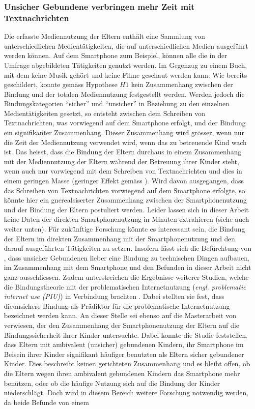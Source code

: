 \subsubsection{Unsicher Gebundene verbringen mehr Zeit mit Textnachrichten}
Die erfasste Mediennutzung der Eltern enthält eine Sammlung von unterschiedlichen Medientätigkeiten, die auf unterschiedlichen Medien ausgeführt werden können. Auf dem Smartphone zum Beispiel, können alle die in der Umfrage abgebildeten Tätigkeiten genutzt werden. Im Gegenzug zu einem Buch, mit dem keine Musik gehört und keine Filme geschaut werden kann. Wie bereits geschildert, konnte gemäss Hypothese $H1$ kein Zusammenhang zwischen der Bindung und der totalen Mediennutzung festgestellt werden. Werden jedoch die Bindungskategorien \enquote{sicher} und \enquote{unsicher} in Beziehung zu den einzelnen Medientätigkeiten gesetzt, so entsteht zwischen dem Schreiben von Textnachrichten, was vorwiegend auf dem Smartphone erfolgt, und der Bindung ein signifikanter Zusammenhang. Dieser Zusammenhang wird grösser, wenn nur die Zeit der Mediennutzung verwendet wird, wenn das zu betreuende Kind wach ist. Das heisst, dass die Bindung der Eltern durchaus in einem Zusammenhang mit der Mediennutzung der Eltern während der Betreuung ihrer Kinder steht, wenn auch nur vorwiegend mit dem Schreiben von Textnachrichten und dies in einem geringen Masse (geringer Effekt gemäss ). Wird davon ausgegangen, dass das Schreiben von Textnachrichten vorwiegend auf dem Smartphone erfolgte, so könnte hier ein gnerealsiserter Zusammenhang zwischen der Smartphonenutzung und der Bindung der Eltern postuliert werden. Leider lassen sich in dieser Arbeit keine Daten der direkten Smartphonenutzung in Minuten extrahieren (siehe auch \textit{} weiter unten). Für zukünftige Forschung könnte es interessant sein, die Bindung der Eltern im direkten Zusammenhang mit der Smartphonenutzung und den darauf ausgeführten Tätigkeiten zu setzen. Insofern lässt sich die Befürchtung von , dass unsicher Gebundenen lieber eine Bindung zu technischen Dingen aufbauen, im Zusammenhang mit dem Smartphone und den Befunden in dieser Arbeit nicht ganz ausschliessen. Zudem unterstreichen die Ergebnisse weiterer Studien, welche die Bindungstheorie mit der problematischen Internetnutzung (\textit{engl. problematic internet use (PIU)}) in Verbindung brachten \cite{Jia2016, Chang2015, Lin2011a}. Dabei stellten sie fest, dass dieunsichere Bindung als Prädiktor für die problematische Internetnutzung bezeichnet werden kann. An dieser Stelle sei ebenso auf die Masterarbeit von  verwiesen, der den Zusammenhang der Smartphonenutzung der Eltern auf die Bindungssicherheit ihrer Kinder untersuchte. Dabei konnte die Studie feststellen, dass Eltern mit ambivalent (unsicher) gebundenen Kindern, ihr Smartphone im Beisein ihrer Kinder signifikant häufiger benutzten als Eltern sicher gebundener Kinder. Dies beschreibt keinen gerichteten Zusammenhang und es bleibt offen, ob die Eltern wegen ihren ambivalent gebundenen Kindern das Smartphone mehr benützen, oder ob die häufige Nutzung sich auf die Bindung der Kinder niederschlägt. Doch wird in diesem Bereich weitere Forschung notwendig werden, da beide Befunde von einem 